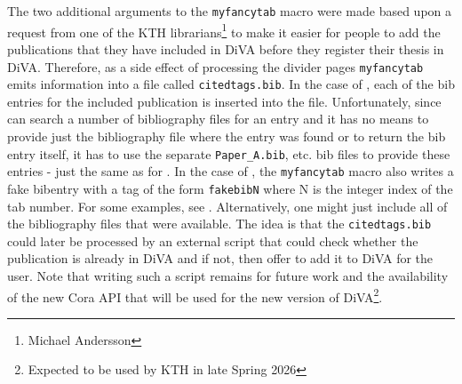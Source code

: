 \documentclass[12pt, twoside]{article}
\begin{document}
The two additional arguments to the \texttt{myfancytab} macro were made based upon a request from one of the KTH librarians\footnote{Michael Andersson} to make it easier for people to add the publications that they have included in \gls{DiVA} before they register their thesis in \gls{DiVA}. Therefore, as a side effect of processing the divider pages \texttt{myfancytab} emits information into a file called \texttt{citedtags.bib}. In the case of \BibTeX, each of the bib entries for the included publication is inserted into the file. Unfortunately, since \BibLaTeX{} can search a number of bibliography files for an entry and it has no means to provide just the bibliography file where the entry was found or to return the bib entry itself, it has to use the separate \texttt{Paper\_A.bib}, etc. bib files to provide these entries - just the same as for \BibTeX. In the case of \BibLaTeX, the \texttt{myfancytab} macro also writes a fake bibentry with a tag of the form \texttt{fakebibN} where N is the integer index of the tab number. For some examples, see .  Alternatively, one might just include all of the bibliography files that were available. The idea is that the \texttt{citedtags.bib} could later be processed by an external script that could check whether the publication is already in \gls{DiVA} and if not, then offer to add it to \gls{DiVA} for the user. Note that writing such a script remains for future work and the availability of the new Cora \gls{API} that will be used for the new version of \gls{DiVA}\footnote{Expected to be used by \gls{KTH} in late Spring 2026}.
\clearpage
\end{document}
